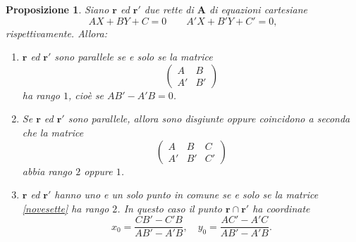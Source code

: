 \documentclass{article}
\theoremstyle{plain}
\newtheorem{prop}[thm]{Proposizione}
\theoremstyle{definition}
\theoremstyle{remark}
\begin{document}
\begin{bxthm}
\begin{prop}\label{noveuno}
Siano $\mathbf{r}$ ed $\mathbf{r}'$ due rette di $\mathbf{A}$ di equazioni cartesiane
\[
AX + BY + C = 0 \quad\quad A'X + B'Y + C' = 0,
\]
rispettivamente. Allora:
\begin{enumerate}
    \item $\mathbf{r}$ ed $\mathbf{r}'$ sono parallele se e solo se la matrice
    \begin{equation}\label{novesette}
    \begin{pmatrix}
    A & B \\
    A' & B'
    \end{pmatrix}    
    \end{equation}
    ha rango $1$, cioè se $AB' - A'B = 0$.

    \item Se $\mathbf{r}$ ed $\mathbf{r}'$ sono parallele, allora sono disgiunte oppure coincidono a seconda che la matrice
    \begin{equation}\label{noveotto}
    \begin{pmatrix}
    A & B & C \\
    A' & B' & C'
    \end{pmatrix}    
    \end{equation}
    abbia rango $2$ oppure $1$.

    \item $\mathbf{r}$ ed $\mathbf{r}'$ hanno uno e un solo punto in comune se e solo se la matrice \ref{novesette} ha rango $2$. 
    In questo caso il punto $\mathbf{r} \cap \mathbf{r}'$ ha coordinate
    \begin{equation}\label{novenove}
    x_0 = \frac{CB' - C'B}{AB' - A'B}, \quad y_0 = \frac{AC' - A'C}{AB' - A'B}.
    \end{equation}
\end{enumerate}    
\end{prop}
\end{bxthm}
\end{document}
